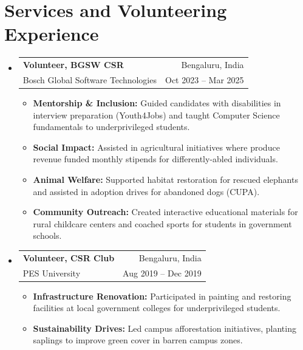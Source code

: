\documentclass[letterpaper,11pt]{article}
\makeatletter
\newcommand{\resumeItem}[1]{
  \item\small{
    {#1 \vspace{-2pt}}
  }
}
\newcommand{\resumeSubheading}[4]{
  \vspace{-2pt}\item
    \begin{tabular*}{0.97\textwidth}[t]{l@{\extracolsep{\fill}}r}
      \textbf{#1} & #2 \\
      \small#3 & \small #4 \\
    \end{tabular*}\vspace{-7pt}
}
\newcommand{\resumeSubHeadingListStart}{\begin{itemize}[leftmargin=0.15in, label={}]}
\newcommand{\resumeSubHeadingListEnd}{\end{itemize}}
\newcommand{\resumeItemListStart}{\begin{itemize}}
\newcommand{\resumeItemListEnd}{\end{itemize}\vspace{-5pt}}
\makeatother
\begin{document}

\section{Services and Volunteering Experience}

\resumeSubHeadingListStart
  \resumeSubheading{Volunteer, BGSW CSR}{Bengaluru, India}{Bosch Global Software Technologies}{Oct 2023 -- Mar 2025}
      \resumeItemListStart
        \resumeItem{\textbf{Mentorship \& Inclusion:} Guided candidates with disabilities in interview preparation (Youth4Jobs) and taught Computer Science fundamentals to underprivileged students.}
        \resumeItem{\textbf{Social Impact:} Assisted in agricultural initiatives where produce revenue funded monthly stipends for differently-abled individuals.}
        \resumeItem{\textbf{Animal Welfare:} Supported habitat restoration for rescued elephants and assisted in adoption drives for abandoned dogs (CUPA).}
        \resumeItem{\textbf{Community Outreach:} Created interactive educational materials for rural childcare centers and coached sports for students in government schools.}
      \resumeItemListEnd

  \resumeSubheading{Volunteer, CSR Club}{Bengaluru, India}{PES University}{Aug 2019 -- Dec 2019}
      \resumeItemListStart
        \resumeItem{\textbf{Infrastructure Renovation:} Participated in painting and restoring facilities at local government colleges for underprivileged students.}
        \resumeItem{\textbf{Sustainability Drives:} Led campus afforestation initiatives, planting saplings to improve green cover in barren campus zones.}
      \resumeItemListEnd
\resumeSubHeadingListEnd
  
\end{document}
